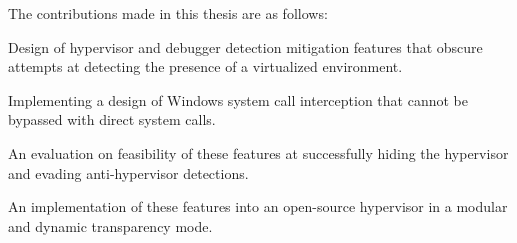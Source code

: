 The contributions made in this thesis are as follows:

\case{}
Design of hypervisor and debugger detection mitigation features that obscure attempts at detecting the presence of a virtualized environment.

\case{}
Implementing a design of Windows system call interception that cannot be bypassed with direct system calls. 

\case{}
An evaluation on feasibility of these features at successfully hiding the hypervisor and evading anti-hypervisor detections.

\case{}
An implementation of these features into an open-source hypervisor in a modular and dynamic transparency mode.


